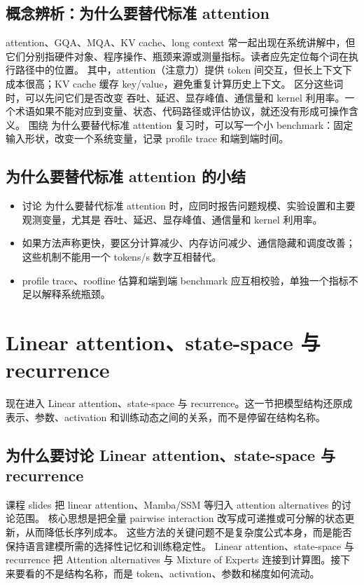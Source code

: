 \documentclass[a4paper]{article}
\begin{document}
\subsection{概念辨析：为什么要替代标准 attention}
attention、GQA、MQA、KV cache、long context 常一起出现在系统讲解中，但它们分别指硬件对象、程序操作、瓶颈来源或测量指标。读者应先定位每个词在执行路径中的位置。
其中，attention（注意力）提供 token 间交互，但长上下文下成本很高；KV cache 缓存 key/value，避免重复计算历史上下文。
区分这些词时，可以先问它们是否改变 吞吐、延迟、显存峰值、通信量和 kernel 利用率。一个术语如果不能对应到变量、状态、代码路径或评估协议，就还没有形成可操作含义。
围绕 为什么要替代标准 attention 复习时，可以写一个小 benchmark：固定输入形状，改变一个系统变量，记录 profile trace 和端到端时间。
\subsection{为什么要替代标准 attention 的小结}
\begin{itemize}
\item 讨论 为什么要替代标准 attention 时，应同时报告问题规模、实验设置和主要观测变量，尤其是 吞吐、延迟、显存峰值、通信量和 kernel 利用率。
\item 如果方法声称更快，要区分计算减少、内存访问减少、通信隐藏和调度改善；这些机制不能用一个 tokens/s 数字互相替代。
\item profile trace、roofline 估算和端到端 benchmark 应互相校验，单独一个指标不足以解释系统瓶颈。
\end{itemize}
\section{Linear attention、state-space 与 recurrence}
现在进入 Linear attention、state-space 与 recurrence。这一节把模型结构还原成表示、参数、activation 和训练动态之间的关系，而不是停留在结构名称。
\subsection{为什么要讨论 Linear attention、state-space 与 recurrence}
课程 slides 把 linear attention、Mamba/SSM 等归入 attention alternatives 的讨论范围。
核心思想是把全量 pairwise interaction 改写成可递推或可分解的状态更新，从而降低长序列成本。
这些方法的关键问题不是复杂度公式本身，而是能否保持语言建模所需的选择性记忆和训练稳定性。
Linear attention、state-space 与 recurrence 把 Attention alternatives 与 Mixture of Experts 连接到计算图。接下来要看的不是结构名称，而是 token、activation、参数和梯度如何流动。
\end{document}
